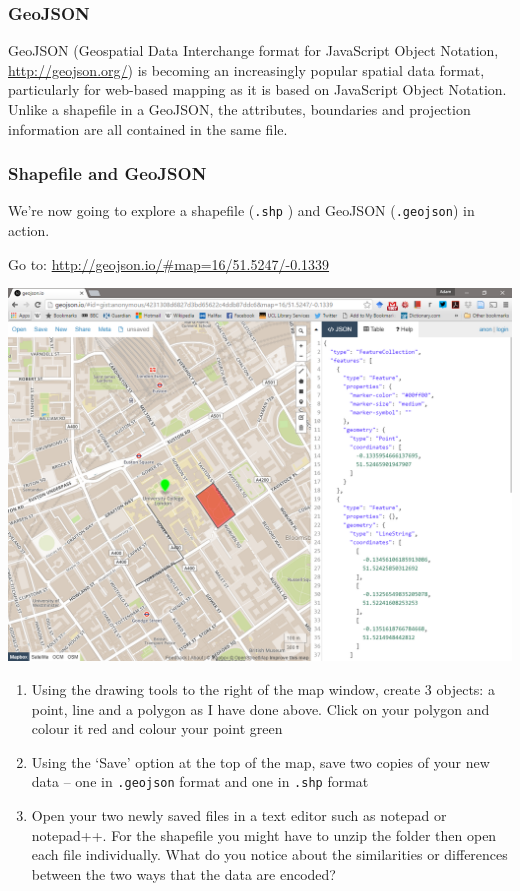 \documentclass[]{book}
\providecommand{\tightlist}{%
  \setlength{\itemsep}{0pt}\setlength{\parskip}{0pt}}
\begin{document}
\hypertarget{geojson}{%
\subsubsection{GeoJSON}\label{geojson}}

GeoJSON (Geospatial Data Interchange format for JavaScript Object Notation, \url{http://geojson.org/}) is becoming an increasingly popular spatial data format, particularly for web-based mapping as it is based on JavaScript Object Notation. Unlike a shapefile in a GeoJSON, the attributes, boundaries and projection information are all contained in the same file.

\hypertarget{shapefile-and-geojson}{%
\subsubsection{Shapefile and GeoJSON}\label{shapefile-and-geojson}}

We're now going to explore a shapefile (\texttt{.shp} ) and GeoJSON (\texttt{.geojson}) in action.

Go to: \url{http://geojson.io/\#map=16/51.5247/-0.1339}

\begin{center}\includegraphics[width=500pt]{prac1_images/JSONwebsite} \end{center}

\begin{enumerate}
\def\labelenumi{\arabic{enumi}.}
\tightlist
\item
  Using the drawing tools to the right of the map window, create 3 objects: a point, line and a polygon as I have done above. Click on your polygon and colour it red and colour your point green
\item
  Using the `Save' option at the top of the map, save two copies of your new data -- one in \texttt{.geojson} format and one in \texttt{.shp} format
\item
  Open your two newly saved files in a text editor such as notepad or notepad++. For the shapefile you might have to unzip the folder then open each file individually. What do you notice about the similarities or differences between the two ways that the data are encoded?
\end{enumerate}
\end{document}
